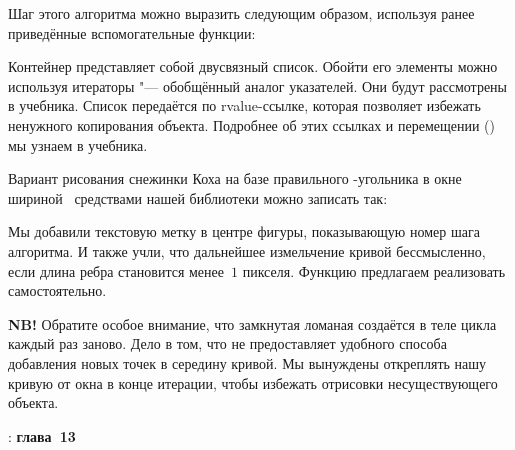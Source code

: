 Шаг этого алгоритма можно выразить следующим образом, используя ранее приведённые вспомогательные функции:


Контейнер  представляет собой двусвязный список. Обойти его элементы можно используя итераторы "--- обобщённый аналог указателей. Они будут рассмотрены в  учебника. Список передаётся по rvalue-ссылке, которая позволяет избежать ненужного копирования объекта. Подробнее об этих ссылках и перемещении () мы узнаем в  учебника.

Вариант рисования снежинки Коха на базе правильного -угольника в окне шириной~ средствами нашей библиотеки  можно записать так:


Мы добавили текстовую метку в центре фигуры, показывающую номер шага алгоритма. И также учли, что дальнейшее измельчение кривой бессмысленно, если длина ребра становится менее~\(1\) пикселя. Функцию  предлагаем реализовать самостоятельно.

\textbf{NB!} Обратите особое внимание, что замкнутая ломаная создаётся в теле цикла каждый раз заново. Дело в том, что  не предоставляет удобного способа добавления новых точек в середину кривой. Мы вынуждены откреплять нашу кривую от окна в конце итерации, чтобы избежать отрисовки несуществующего объекта.


%



\WhatToReadSection
\textcite{Stroustrup:2016:ru}: \textbf{глава~13}



